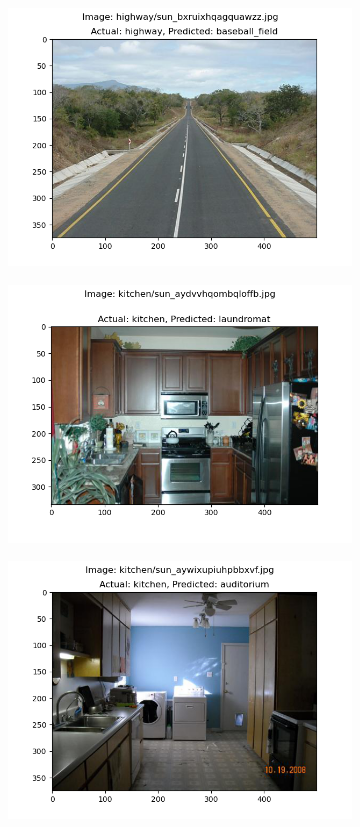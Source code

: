 \documentclass{article} %
\begin{document}
\begin{figure}[h]
\begin{subfigure}[b]{0.333\textwidth}
            \includegraphics[width=\textwidth]{q2,6_case_68.png}
        \end{subfigure}
        \begin{subfigure}[b]{0.333\textwidth}
            \includegraphics[width=\textwidth]{q2,6_case_88.png}
        \end{subfigure}
        \begin{subfigure}[b]{0.333\textwidth}
            \includegraphics[width=\textwidth]{q2,6_case_91.png}

\end{subfigure}
\end{figure}
\end{document}
